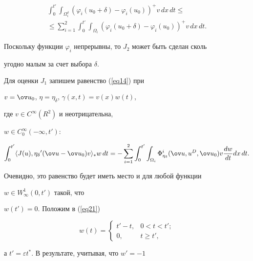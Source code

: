 \begin{pf}
\begin{multline*}
\int_{0}^{{t}'} \int_{\Omega_{i}^{\delta}}


({\varphi_{i} (u_{0}+\delta)-\varphi_{i}(u_{0})})^{+} v\, d x\, d t \le \\


%


\le\sum^2_{i=1}\int^{t'}_0\int_{\Omega_i}(\varphi_i(u_0+\delta)-


\varphi_i(u_0))^+ v\,dx\,dt.


\end{multline*}


Поскольку функции $\varphi_i$ непрерывны, то $J_2$ может быть сделан сколь


угодно малым за счет выбора $\delta$.





Для оценки $J_{1}$ запишем равенство (\ref{eq14}) при


$v=\ov u_{0}$, $\eta=\eta_{\delta}$, $\gamma (x,t)=v (x) w(t)$,


где $v \in C^{\infty}(R^{2})$ и неотрицательна, 


$w \in C^{\infty}_{0}(- \infty,{t}')$:


\begin{equation} \label{eq21} 


\int_{0}^{{t}'} \langle J(u), {\eta_{\delta}}'(\ov u-\ov u_{0})v\rangle_{*}


w\, d t=- \sum_{i=1}^{2} 


\int_{0}^{{t}'} \int_{\Omega_{i}} \Phi_{\eta_{\delta}}^{i}


(\ov u, u^{D}, \ov u_{0}) v \frac{d w}{dt} d x\, d t. 


\end{equation}


Очевидно, это равенство будет иметь место и для любой функции 


$w \in W_{\infty}^{1}(0,{t}')$ такой, что


$w({t}')=0$. Положим в (\ref{eq21}) 


$$ 


w(t)=


\begin{cases}


{t}' -t, & 0 < t <{t}'; \\


0, & t \geq{t}',


\end{cases}


$$


а ${t}'=\varepsilon t^{*}. $ В результате, учитывая, что ${w}'=- 1$ 



\end{pf}
